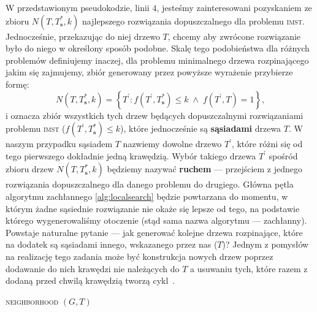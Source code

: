 W przedstawionym pseudokodzie, linii $4$, jesteśmy zainteresowani pozyskaniem ze zbioru $N \left( T, T^{\ast}_{\textbf{s}}, k \right)$ najlepszego rozwiązania dopuszczalnego dla problemu \textsc{imst}. Jednocześnie, przekazując do niej drzewo $T$, chcemy aby zwrócone rozwiązanie było do niego w określony sposób podobne. Skalę tego podobieństwa dla różnych problemów definiujemy inaczej, dla problemu minimalnego drzewa rozpinającego jakim się zajmujemy, zbiór generowany przez powyższe wyrażenie przybierze formę:
\begin{equation}
	N \left( T, T^{\ast}_{\textbf{s}}, k \right) = \left\{ T^{\prime} : f \left( T^{\prime}, T^{\ast}_{\textbf{s}} \right) \leqslant k \; \wedge \; f \left( T^{\prime}, T \right) = 1 \right\}\text{,}
\end{equation}
i oznacza zbiór wszystkich tych drzew będących dopuszczalnymi rozwiązaniami problemu \textsc{imst} ($f \left( T^{\prime}, T^{\ast}_{\textbf{s}} \right) \leqslant k$), które jednocześnie są \textbf{sąsiadami} drzewa $T$. W naszym przypadku sąsiadem $T$ nazwiemy dowolne drzewo $T^{\prime}$, które różni się od tego pierwszego dokładnie jedną krawędzią. Wybór takiego drzewa $T^{\prime}$ spośród zbioru drzew $N \left( T, T^{\ast}_{\textbf{s}}, k \right)$ będziemy nazywać \textbf{ruchem} --- przejściem z jednego rozwiązania dopuszczalnego dla danego problemu do drugiego. Główna pętla algorytmu zachłannego \ref{alg:localsearch} będzie powtarzana do momentu, w którym żadne sąsiednie rozwiązanie nie okaże się lepsze od tego, na podstawie którego wygenerowaliśmy otoczenie (stąd sama nazwa algorytmu --- zachłanny). Powstaje naturalne pytanie --- jak generować kolejne drzewa rozpinające, które na dodatek są sąsiadami innego, wskazanego przez nas ($T$)? Jednym z pomysłów na realizację tego zadania może być konstrukcja nowych drzew poprzez dodawanie do nich krawędzi nie należących do $T$ a usuwaniu tych, które razem z dodaną przed chwilą krawędzią tworzą cykl~\cite{Kasperski2012}.

\begin{pseudokod}[!hbtp]
	\DontPrintSemicolon
	\caption{\textsc{neighborhood} $\left( G, T \right)$}
	\label{alg:neighborhood}
\end{pseudokod}

